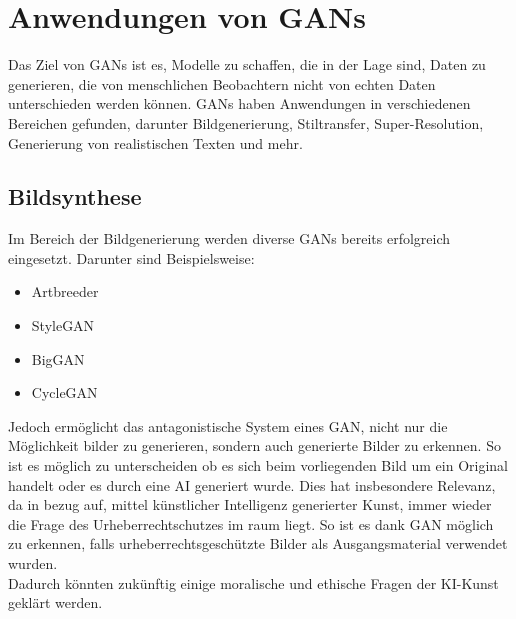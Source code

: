 \chapter{Anwendungen von GANs}

\noindent 
Das Ziel von GANs ist es, Modelle zu schaffen, die in der Lage sind, Daten zu generieren, die von menschlichen Beobachtern nicht von echten Daten unterschieden werden können. GANs haben Anwendungen in verschiedenen Bereichen gefunden, darunter Bildgenerierung, Stiltransfer, Super-Resolution, Generierung von realistischen Texten und mehr.

\section{Bildsynthese}


\noindent Im Bereich der Bildgenerierung werden diverse GANs bereits erfolgreich eingesetzt. Darunter sind Beispielsweise: 
\begin{itemize}
\item Artbreeder
\item StyleGAN
\item BigGAN
\item CycleGAN
\end{itemize}

\noindent Jedoch ermöglicht das antagonistische System eines GAN, nicht nur die Möglichkeit bilder zu generieren, sondern auch generierte Bilder zu erkennen. So ist es möglich zu unterscheiden ob es sich beim vorliegenden Bild um ein Original handelt oder es durch eine AI generiert wurde.
Dies hat insbesondere Relevanz, da in bezug auf, mittel künstlicher Intelligenz generierter Kunst, immer wieder die Frage des Urheberrechtschutzes im raum liegt. So ist es dank GAN möglich zu erkennen, falls urheberrechtsgeschützte Bilder als Ausgangsmaterial verwendet wurden. \\

\noindent Dadurch könnten zukünftig einige moralische und ethische Fragen der KI-Kunst geklärt werden.

\newpage
